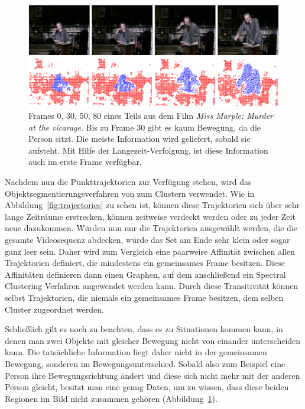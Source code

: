 \begin{figure}[bt]\centering\includegraphics[width=7.0in]{images/motion.png}
  \caption{Frames 0, 30, 50, 80 eines Teils aus dem Film \emph{Miss Marple: Murder at the vicarage}. Bis zu Frame 30 gibt es kaum Bewegung,
  da die Person sitzt. Die meiste Information wird geliefert, sobald sie aufsteht. Mit Hilfe der Langezeit-Verfolgung, ist diese Information
auch im erste Frame verfügbar.}
  \label{fig:motion}
\end{figure}


Nachdem nun die Punkttrajektorien zur Verfügung stehen, wird das Objektsegmentierungsverfahren von \cite{a001} zum Clustern verwendet.
Wie in Abbildung~\ref{fig:trajectories} zu sehen ist, können diese Trajektorien sich über sehr lange Zeiträume erstrecken, können zeitweise
verdeckt werden oder zu jeder Zeit neue dazukommen. Würden nun nur die Trajektorien ausgewählt werden, die die gesamte Videosequenz abdecken,
würde das Set am Ende sehr klein oder sogar ganz leer sein. Daher wird zum Vergleich eine paarweise Affinität zwischen allen Trajektorien definiert,
die mindestens ein gemeinsames Frame besitzen. Diese Affinitäten definieren dann einen Graphen, auf dem anschließend ein Spectral Clustering Verfahren
angewendet werden kann. Durch diese Transitivität können selbst Trajektorien, die niemals ein gemeinsames Frame besitzen,
dem selben Cluster zugeordnet werden.

Schließlich gilt es noch zu beachten, dass es zu Situationen kommen kann, in denen man zwei Objekte mit gleicher Bewegung nicht von einander unterscheiden
kann. Die tatsächliche Information liegt daher nicht in der gemeinsamen Bewegung, sonderen im Bewegungsunterschied. Sobald also zum Beispiel eine Person
ihre Bewegungsrichtung ändert und diese sich nicht mehr mit der anderen Person gleicht, besitzt man eine genug Daten, um zu wissen, dass diese beiden
Regionen im Bild nicht zusammen gehören (Abbildung~\ref{fig:motion}).


